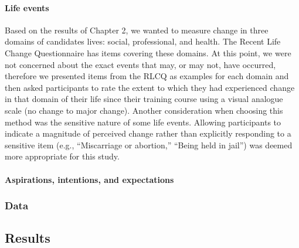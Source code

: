 \documentclass[a4paper,]{book}
\let\oldparagraph\paragraph
\renewcommand{\paragraph}[1]{\oldparagraph{#1}\mbox{}}
\begin{document}
\hypertarget{life-events}{%
\paragraph{Life events}\label{life-events}}

Based on the results of Chapter 2, we wanted to measure change in three domains of candidates lives: social, professional, and health. The Recent Life Change Questionnaire \citep[RLCQ;][]{Miller1997} has items covering these domains. At this point, we were not concerned about the exact events that may, or may not, have occurred, therefore we presented items from the RLCQ as examples for each domain and then asked participants to rate the extent to which they had experienced change in that domain of their life since their training course using a visual analogue scale (no change to major change). Another consideration when choosing this method was the sensitive nature of some life events. Allowing participants to indicate a magnitude of perceived change rather than explicitly responding to a sensitive item (e.g., ``Miscarriage or abortion,'' ``Being held in jail'') was deemed more appropriate for this study.

\hypertarget{aspirations-intentions-and-expectations}{%
\paragraph{Aspirations, intentions, and expectations}\label{aspirations-intentions-and-expectations}}

\hypertarget{data}{%
\subsubsection{Data}\label{data}}

\hypertarget{results-2}{%
\subsection{Results}\label{results-2}}
\end{document}
